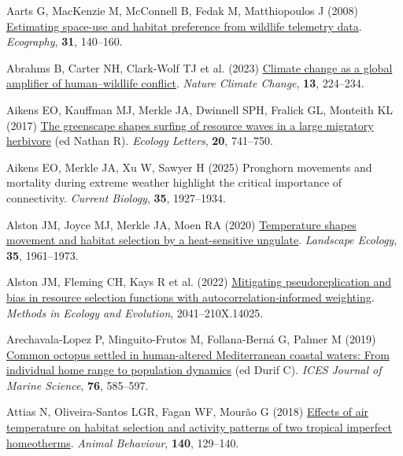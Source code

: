 \documentclass[
  12pt,
]{article}
\newlength{\cslhangindent}
\newenvironment{CSLReferences}[2] %
 {\begin{list}{}{%
  \setlength{\itemindent}{0pt}
  \setlength{\leftmargin}{0pt}
  \setlength{\parsep}{0pt}
  \ifodd #1
   \setlength{\leftmargin}{\cslhangindent}
   \setlength{\itemindent}{-1\cslhangindent}
  \fi
  \setlength{\itemsep}{#2\baselineskip}}}
 {\end{list}}
\begin{document}
\protect{}\label{refs}
\begin{CSLReferences}{1}{0}
Aarts G, MacKenzie M, McConnell B, Fedak M, Matthiopoulos J (2008) \href{https://doi.org/10.1111/j.2007.0906-7590.05236.x}{Estimating space-use and habitat preference from wildlife telemetry data}. \emph{Ecography}, \textbf{31}, 140--160.

Abrahms B, Carter NH, Clark-Wolf TJ et al. (2023) \href{https://doi.org/10.1038/s41558-023-01608-5}{Climate change as a global amplifier of human--wildlife conflict}. \emph{Nature Climate Change}, \textbf{13}, 224--234.

Aikens EO, Kauffman MJ, Merkle JA, Dwinnell SPH, Fralick GL, Monteith KL (2017) \href{https://doi.org/10.1111/ele.12772}{The greenscape shapes surfing of resource waves in a large migratory herbivore} (ed Nathan R). \emph{Ecology Letters}, \textbf{20}, 741--750.

Aikens EO, Merkle JA, Xu W, Sawyer H (2025) Pronghorn movements and mortality during extreme weather highlight the critical importance of connectivity. \emph{Current Biology}, \textbf{35}, 1927--1934.

Alston JM, Joyce MJ, Merkle JA, Moen RA (2020) \href{https://doi.org/10.1007/s10980-020-01072-y}{Temperature shapes movement and habitat selection by a heat-sensitive ungulate}. \emph{Landscape Ecology}, \textbf{35}, 1961--1973.

Alston JM, Fleming CH, Kays R et al. (2022) \href{https://doi.org/10.1111/2041-210X.14025}{Mitigating pseudoreplication and bias in resource selection functions with autocorrelation‐informed weighting}. \emph{Methods in Ecology and Evolution}, 2041--210X.14025.

Arechavala-Lopez P, Minguito-Frutos M, Follana-Berná G, Palmer M (2019) \href{https://doi.org/10.1093/icesjms/fsy014}{Common octopus settled in human-altered {Mediterranean} coastal waters: From individual home range to population dynamics} (ed Durif C). \emph{ICES Journal of Marine Science}, \textbf{76}, 585--597.

Attias N, Oliveira-Santos LGR, Fagan WF, Mourão G (2018) \href{https://doi.org/10.1016/j.anbehav.2018.04.011}{Effects of air temperature on habitat selection and activity patterns of two tropical imperfect homeotherms}. \emph{Animal Behaviour}, \textbf{140}, 129--140.


\end{CSLReferences}
\end{document}
